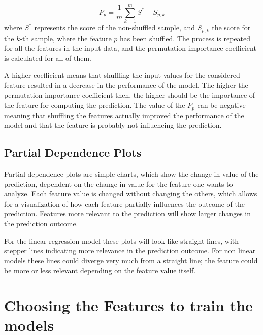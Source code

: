 \begin{equation}\label{eq:perm}
P_p = \frac{1}{m}\sum_{k=1}^{m}S^*-{S_{p,k}}
\end{equation} 
where $S^*$ represents the score of the non-shuffled sample, and $S_{p,k}$ the score for the $k$-th sample, where the feature $p$ has been shuffled.
The process is repeated for all the features in the input data, and the permutation importance coefficient is calculated for all of them.

A higher coefficient means that shuffling the input values for the considered feature resulted in a decrease in the performance of the model. The higher the permutation importance coefficient then, the higher should be the importance of the feature for computing the prediction. The value of the $P_p$ can be negative meaning that shuffling the features actually improved the performance of the model and that the feature is probably not influencing the prediction.

\subsection{Partial Dependence Plots}
Partial dependence plots are simple charts, which show the change in value of the prediction, dependent on the change in value for the feature one wants to analyze. Each feature value is changed without changing the others, which allows for a visualization of how each feature partially influences the outcome of the prediction. Features more relevant to the prediction will show larger changes in the prediction outcome.

For the linear regression model these plots will look like straight lines, with stepper lines indicating more relevance in the prediction outcome. For non linear models these lines could diverge very much from a straight line; the feature could be more or less relevant depending on the feature value itself.  

\section{Choosing the Features to train the models}\label{features}

